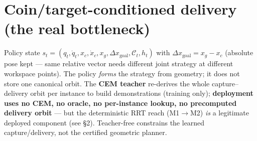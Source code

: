 \documentclass[11pt]{article}
\begin{document}
\section{Coin/target-conditioned delivery (the real bottleneck)}
Policy state $s_t=(q_t,\dot q_t,x_c,\dot x_c,x_g,\Delta x_{\mathrm{goal}},\mathcal C_t,h_t)$ with
$\Delta x_{\mathrm{goal}}=x_g-x_c$ (absolute pose kept --- same relative vector needs different joint strategy at different
workspace points). The policy \emph{forms} the strategy from geometry; it does not store one canonical orbit. The
\textbf{CEM teacher} re-derives the whole capture--delivery orbit per instance to build demonstrations (training only);
\textbf{deployment uses no CEM, no oracle, no per-instance lookup, no precomputed delivery orbit} --- but the deterministic
RRT reach (M1$\to$M2) \emph{is} a legitimate deployed component (see \S2). Teacher-free constrains the learned
capture/delivery, not the certified geometric planner.
\end{document}

